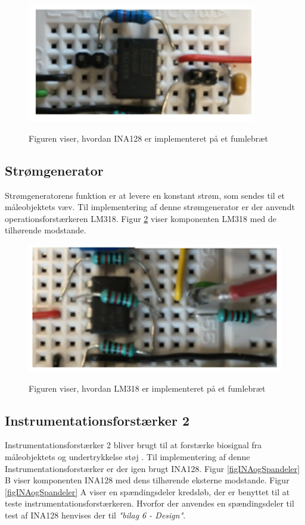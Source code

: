\begin{figure}[H] 
\centering
{\includegraphics[width=10cm]
{Figure/INA128IM}}
\caption{Figuren viser, hvordan INA128 er implementeret på et fumlebræt  }
\label{figScrip}
\end{figure}



\subsection{Strømgenerator}
Strømgeneratorens funktion er at levere en konstant strøm, som sendes til et måleobjektets væv. Til implementering af denne strømgenerator er der anvendt operationsforstærkeren LM318. Figur \ref{figScrip1}
viser komponenten LM318 med de tilhørende modstande. 
\begin{figure}[H] 
\centering
{\includegraphics[width=\linewidth]
{Figure/LM318IM}}
\caption{Figuren viser, hvordan LM318 er implementeret på et fumlebræt  }
\label{figScrip1}
\end{figure}


\subsection{Instrumentationsforstærker 2}

Instrumentationsforstærker 2 bliver brugt til at forstærke biosignal fra måleobjektets og undertrykkelse støj . Til implementering af denne Instrumentationsforstærker er der igen brugt INA128. Figur \ref{figINAogSpandeler} B viser komponenten INA128 med dens tilhørende eksterne modstande. Figur \ref{figINAogSpandeler} A viser en spændingsdeler kredsløb, der er benyttet til at teste instrumentationsforstærkeren. Hvorfor der anvendes en spændingsdeler til test af INA128 henvises der til \textit{"bilag 6 - Design"}. 



